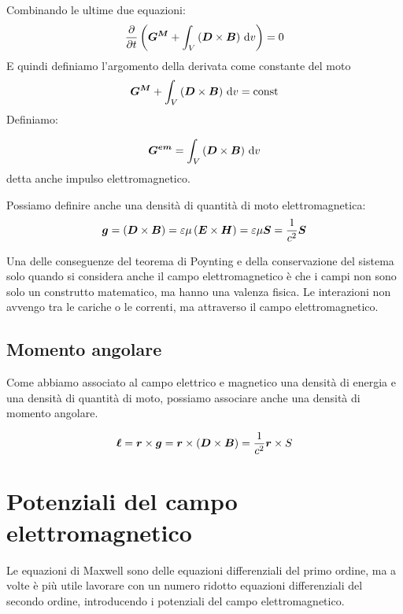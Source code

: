 Combinando le ultime due equazioni:
\begin{equation}
  \frac{\partial}{\partial t}\left(\boldsymbol{G^M}+\int_V\left(\boldsymbol{D}\times\boldsymbol{B}\right)\,\mathrm{d} v \right)=0
\end{equation}
E quindi definiamo l'argomento della derivata come constante del moto
\begin{equation}
  \boldsymbol{G^M}+\int_V\left(\boldsymbol{D}\times\boldsymbol{B}\right)\,\mathrm{d} v=\boldsymbol{\text{const}}
\end{equation}
Definiamo:
\begin{Def}
  \begin{equation}
    \boldsymbol{G^{em}}=\int_V\left(\boldsymbol{D}\times\boldsymbol{B}\right)\,\mathrm{d} v
  \end{equation}
  detta anche impulso elettromagnetico.
\end{Def}
Possiamo definire anche una densità di quantità di moto elettromagnetica:
\begin{equation}
  \boldsymbol{g}=\left(\boldsymbol{D}\times\boldsymbol{B}\right)=\varepsilon\mu\left(\boldsymbol{E}\times\boldsymbol{H}\right)=\varepsilon\mu\boldsymbol{S}=\frac{1}{c^2}\boldsymbol{S}
\end{equation}

Una delle conseguenze del teorema di Poynting e della conservazione del sistema solo quando si considera anche il campo elettromagnetico è che i campi non sono solo un construtto matematico, ma hanno una valenza fisica. Le interazioni non avvengo tra le cariche o le correnti, ma attraverso il campo elettromagnetico.

\subsection{Momento angolare}
Come abbiamo associato al campo elettrico e magnetico una densità di energia e una densità di quantità di moto, possiamo associare anche una densità di momento angolare. 

\begin{equation}
\boldsymbol{\ell} = \boldsymbol{r} \times \boldsymbol{g} = \boldsymbol{r} \times \left(\boldsymbol{D} \times \boldsymbol{B}\right) = \frac{1}{c^2}\boldsymbol{r} \times S
\end{equation}

\section{Potenziali del campo elettromagnetico}
Le equazioni di Maxwell sono delle equazioni differenziali del primo ordine, ma a volte è più utile lavorare con un numero ridotto equazioni differenziali del secondo ordine, introducendo i potenziali del campo elettromagnetico.

